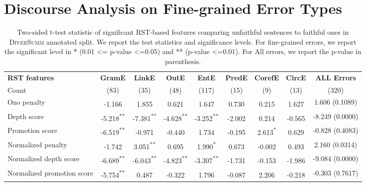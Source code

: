 \section{Discourse Analysis on Fine-grained Error Types}\label{sec:appendix_discourse_test}
\begin{table*}[h!]
    \centering
    \scriptsize
    \begin{NiceTabular}{l|c|c|c|c|c|c|c|c}
    \toprule
    \textbf{RST features}     & \textbf{GramE} & \textbf{LinkE} & \textbf{OutE} & \textbf{EntE} & \textbf{PredE} & \textbf{CorefE} & \textbf{CircE} & \textbf{ALL Errors}\\
    Count & (83) & (35) & (48) & (117) & (15) & (9) & (13) & (320)\\
    
    \midrule
      Ono penalty   &  -1.166\textsuperscript{}& 1.855\textsuperscript{}& 0.621\textsuperscript{}& 1.647\textsuperscript{}& 0.730\textsuperscript{}& 0.215\textsuperscript{}& 1.627\textsuperscript{}& 1.606 (0.1089)\\
      Depth score& -5.218\textsuperscript{**}& -7.381\textsuperscript{**}& -4.628\textsuperscript{**}& -3.252\textsuperscript{**}& -2.002\textsuperscript{}& 0.214\textsuperscript{}& -0.565\textsuperscript{}& -8.249 (0.0000)\\
    Promotion score  & -6.519\textsuperscript{**}& -0.971\textsuperscript{}& -0.440\textsuperscript{}& 1.734\textsuperscript{}& -0.195\textsuperscript{}& 2.613\textsuperscript{*}& 0.629\textsuperscript{}& -0.828 (0.4083)\\
    \midrule
    Normalized penalty  &  -1.742\textsuperscript{}& 3.051\textsuperscript{**}& 0.695\textsuperscript{}& 1.990\textsuperscript{*}& 0.673\textsuperscript{}& -0.002\textsuperscript{}& 0.493\textsuperscript{}& 2.160 (0.0314)\\
      Normalized depth score & -6.689\textsuperscript{**}& -6.043\textsuperscript{**}& -4.823\textsuperscript{**}& -3.307\textsuperscript{**}& -1.731\textsuperscript{}& -0.153\textsuperscript{}& -1.986\textsuperscript{}& -9.084 (0.0000)\\
        Normalized promotion score &  -5.754\textsuperscript{**}& 0.487\textsuperscript{}& -0.322\textsuperscript{}& 1.796\textsuperscript{}& -0.087\textsuperscript{}& 2.206\textsuperscript{}& -0.218\textsuperscript{}& -0.303 (0.7617)  \\
    \bottomrule
      
    \end{NiceTabular}
    \caption{Two-sided t-test statistic of significant RST-based
features comparing unfaithful sentences to faithful
ones in \textsc{DiverSumm} annotated split. We report the
test statistics and significance levels. For fine-grained errors, we report the significant level in * (0.01 <= p-value <=0.05) and ** (p-value <=0.01). For All errors, we report the p-value in parenthesis.}
    \label{tab:rst_result_all_errors}
\end{table*}



